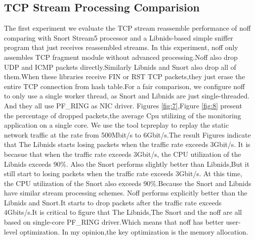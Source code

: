 \documentclass[conference]{IEEEtran}
\begin{document}
\subsection{TCP Stream Processing Comparision}
The first experiment we evaluate the TCP stream reassemble performance of noff comparing with Snort Stream5 processor and a Libnids-based simple sniffer program that just receives reassembled streams.
In this experiment, noff only assembles TCP fragment module without advanced processing.Noff also drop UDP and ICMP packets directly.Similarly Libnids and Snort also drop all of them.When these libraries receive FIN or RST TCP packets,they just erase the entire TCP connection from hash table.For a fair comparison, we configure noff to only use a single worker thread, as Snort and Libnids are just single-threaded. And they all use PF\_RING as NIC driver.
\newline\indent Figures \ref{fig:7},Figure \ref{fig:8} present the percentage of dropped packets,the average Cpu utilizing of the monitoring application on a single core. We use the tool tcpreplay to replay the static network traffic at the rate from 500Mbit/s to 6Gbit/s.The result Figures indicate that The Libnids starts losing packets when the traffic rate exceeds 3Gbit/s. It is becasue that when the traffic rate exceeds 3Gbit/s, the CPU utilization of the Libnids exceeds 90\%. Also the Snort performs slightly better than Libnids,But it still start to losing packets when the traffic rate exceeds 3Gbit/s. At this time, the CPU utilization of the Snort also exceeds 90\%.Because the Snort and Libnids have similar stream processing schemes. 
\newline\indent Noff performs explicitly better than the Libnids and Snort.It starts to drop packets after the traffic rate exceeds 4Gbits/s.It is critical to figure that The Libnids,The Snort and the noff are all based on single-core PF\_RING driver.Which means that noff has better user-level optimization. In my opinion,the key optimization is the memory allocation.
\end{document}
